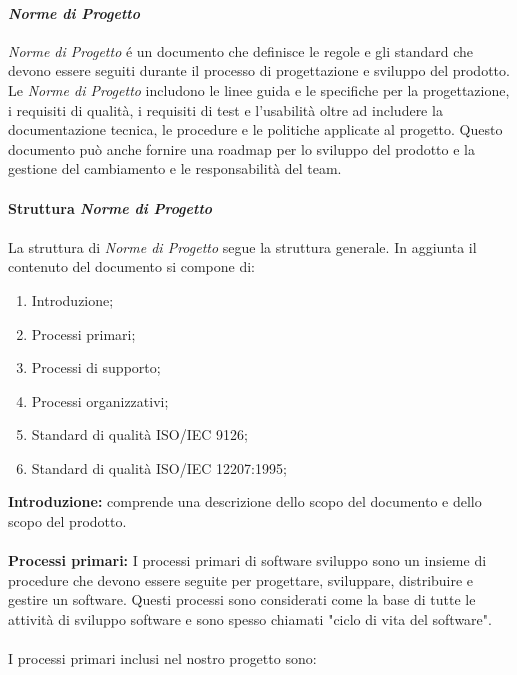 \paragraph{\textit{Norme di Progetto}}
\textit{Norme di Progetto} é un documento che definisce le regole e gli standard che devono essere seguiti durante il processo di progettazione e 
sviluppo del prodotto. Le \textit{Norme di Progetto} includono le linee guida e le specifiche per la progettazione, i requisiti di qualità,
i requisiti di test e l'usabilità oltre ad includere la documentazione tecnica, le procedure 
e le politiche applicate al progetto. Questo documento può anche fornire una roadmap per lo sviluppo del prodotto e la gestione del cambiamento 
e le responsabilità del team.
\\\\
\textbf{Struttura \textit{Norme di Progetto}}
\\\\
La struttura di \textit{Norme di Progetto} segue la struttura generale.
In aggiunta il contenuto del documento si compone di:
\begin{enumerate}
    \item Introduzione;
    \item Processi primari;
    \item Processi di supporto;
    \item Processi organizzativi;
    \item Standard di qualità ISO/IEC 9126;
    \item Standard di qualità ISO/IEC 12207:1995;
\end{enumerate}
\textbf{Introduzione:} comprende una descrizione dello scopo del documento e dello scopo del prodotto.
\\\\
\textbf{Processi primari:}
I processi primari di software sviluppo sono un insieme di procedure che devono essere seguite per progettare, sviluppare, distribuire e gestire un software. 
Questi processi sono considerati come la base di tutte le attività di sviluppo software e sono spesso chiamati "ciclo di vita del software". 
\\\\
I processi primari inclusi nel nostro progetto sono:
